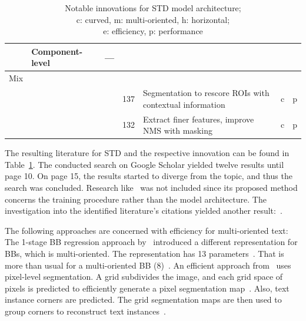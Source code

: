 \begin{table}[ht]
\begin{tabular}{p{}p{}p{}p{}
            p{}p{}p{}}
            & Component-level &~--- & & \\
        \midrule
        Mix & & \\
            & &~\cite{xie_scene_2018} & 137 & Segmentation to rescore \acp{ROI} with
                contextual information & c & p \\
            & &~\cite{dai_fused_2018} & 132 & Extract finer features, improve \ac{NMS} with masking
            & c & p \\
        \bottomrule
    \end{tabular}
    \captionsetup{justification=centering}
    \caption[Notable innovations for STD model architecture]{%
        Notable innovations for STD model architecture; \\
        c: curved, m: multi-oriented, h: horizontal; \\
        e: efficiency, p: performance\label{tb:STD-steps-properties}
    }
\end{table}
The resulting literature for \ac{STD} and the respective innovation can be found in
Table~\ref{tb:STD-steps-properties}.
The conducted search on Google Scholar yielded twelve results until page 10.
On page 15, the results started to diverge from the topic, and thus the search was concluded.
Research like~\cite{xue_accurate_2018} was not included since its proposed method concerns the
training procedure rather than the model architecture.
The investigation into the identified literature's citations yielded another
result:~\cite{ferrari_textsnake_2018}.

The following approaches are concerned with efficiency for multi-oriented text:
The 1-stage \ac{BB} regression approach by~\citep{liao_textboxes_2018} introduced a different
representation for \acp{BB}, which is multi-oriented.
The representation has 13 parameters~\citep{liao_textboxes_2018}.
That is more than usual for a multi-oriented \ac{BB} (8)~\citep{ma_arbitrary-oriented_2018}.
An efficient approach from~\cite{lyu_multi-oriented_2018} uses pixel-level segmentation.
A grid subdivides the image, and each grid space of pixels is
predicted to efficiently generate a pixel segmentation map~\citep{lyu_multi-oriented_2018}.
Also, text instance corners are predicted.
The grid segmentation maps are then used to group corners to reconstruct text
instances~\citep{lyu_multi-oriented_2018}.

